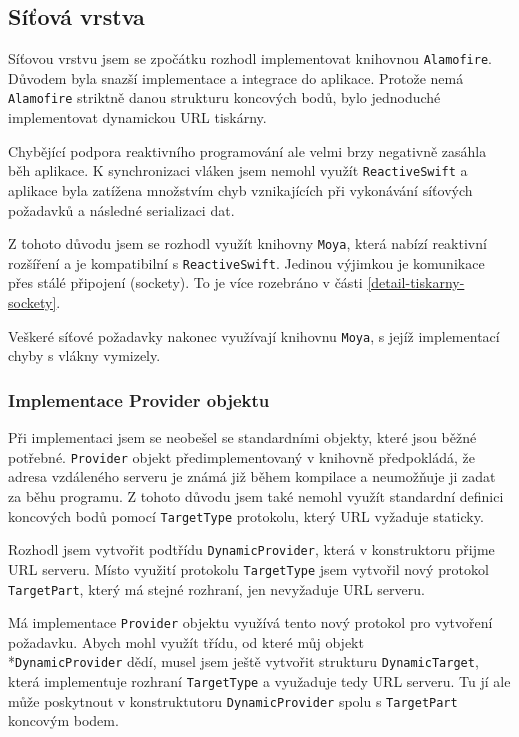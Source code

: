\subsection{Síťová vrstva}

Síťovou vrstvu jsem se zpočátku rozhodl implementovat knihovnou \texttt{Alamofire}.
Důvodem byla snazší implementace a integrace do aplikace.
Protože nemá \texttt{Alamofire} striktně danou strukturu koncových bodů, bylo jednoduché implementovat dynamickou URL tiskárny.

Chybějící podpora reaktivního programování ale velmi brzy negativně zasáhla běh aplikace.
K synchronizaci vláken jsem nemohl využít \texttt{ReactiveSwift} a aplikace byla zatížena množstvím chyb vznikajících při vykonávání síťových požadavků a následné serializaci dat.

Z tohoto důvodu jsem se rozhodl využít knihovny \texttt{Moya}, která nabízí reaktivní rozšíření a je kompatibilní s \texttt{ReactiveSwift}.
Jedinou výjimkou je komunikace přes stálé připojení (sockety).
To je více rozebráno v části \ref{detail-tiskarny-sockety}.

Veškeré síťové požadavky nakonec využívají knihovnu \texttt{Moya}, s jejíž implementací chyby s vlákny vymizely.

\subsubsection*{Implementace Provider objektu}

Při implementaci jsem se neobešel se standardními objekty, které jsou běžné potřebné.
\texttt{Provider} objekt předimplementovaný v knihovně předpokládá, že adresa vzdáleného serveru je známá již během kompilace a neumožňuje ji zadat za běhu programu.
Z tohoto důvodu jsem také nemohl využít standardní definici koncových bodů pomocí \texttt{TargetType} protokolu, který URL vyžaduje staticky.

Rozhodl jsem vytvořit podtřídu \texttt{DynamicProvider}, která v konstruktoru přijme URL serveru.
Místo využití protokolu \texttt{TargetType} jsem vytvořil nový protokol \texttt{TargetPart}, který má stejné rozhraní, jen nevyžaduje URL serveru.

Má implementace \texttt{Provider} objektu využívá tento nový protokol pro vytvoření požadavku.
Abych mohl využít třídu, od které můj objekt\\*\texttt{DynamicProvider} dědí, musel jsem ještě vytvořit strukturu \texttt{DynamicTarget}, která implementuje rozhraní \texttt{TargetType} a využaduje tedy URL serveru.
Tu jí ale může poskytnout v konstruktutoru \texttt{DynamicProvider} spolu s \texttt{TargetPart} koncovým bodem.

